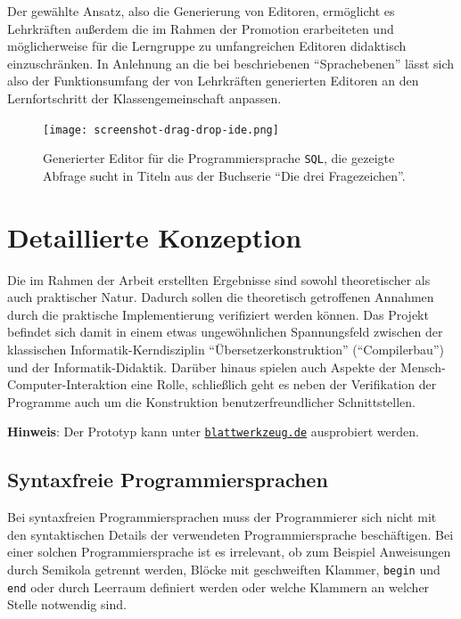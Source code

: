 \documentclass[paper=a4,fontsize=11pt,parskip=half]{scrartcl}
\begin{document}
Der gewählte Ansatz, also die Generierung von Editoren, ermöglicht es Lehrkräften außerdem die im Rahmen der Promotion erarbeiteten und möglicherweise für die Lerngruppe zu umfangreichen Editoren didaktisch einzuschränken. In Anlehnung an die bei \cite{klaeren_macht_2007} beschriebenen \enquote{Sprachebenen} lässt sich also der Funktionsumfang der von Lehrkräften generierten Editoren an den Lernfortschritt der Klassengemeinschaft anpassen.

\begin{figure}[h]
  \centering\texttt{[image: screenshot-drag-drop-ide.png]}
  \caption{Generierter Editor für die Programmiersprache \texttt{SQL}, die gezeigte Abfrage sucht in Titeln aus der Buchserie \enquote{Die drei Fragezeichen}.}
  \label{fig:example-sql-ide}
\end{figure}

\clearpage

\restoregeometry
\pagestyle{plain}

\section{Detaillierte Konzeption}

Die im Rahmen der Arbeit erstellten Ergebnisse sind sowohl theoretischer als auch praktischer Natur. Dadurch sollen die theoretisch getroffenen Annahmen durch die praktische Implementierung verifiziert werden können. Das Projekt befindet sich damit in einem etwas ungewöhnlichen Spannungsfeld zwischen der klassischen Informatik-Kerndisziplin \enquote{Übersetzerkonstruktion} (\enquote{Compilerbau}) und der Informatik-Didaktik. Darüber hinaus spielen auch Aspekte der Mensch-Computer-Interaktion eine Rolle, schließlich geht es neben der Verifikation der Programme auch um die Konstruktion benutzerfreundlicher Schnittstellen.

\begin{framed}
  \textbf{Hinweis}: Der Prototyp kann unter \href{https://blattwerkzeug.de}{\texttt{blattwerkzeug.de}} ausprobiert werden.
\end{framed}

\subsection{Syntaxfreie Programmiersprachen}

Bei syntaxfreien Programmiersprachen muss der Programmierer sich nicht mit den syntaktischen Details der verwendeten Programmiersprache beschäftigen. Bei einer solchen Programmiersprache ist es irrelevant, ob zum Beispiel Anweisungen durch Semikola getrennt werden, Blöcke mit geschweiften Klammer, \texttt{begin} und \texttt{end} oder durch Leerraum definiert werden oder welche Klammern an welcher Stelle notwendig sind.
\end{document}
